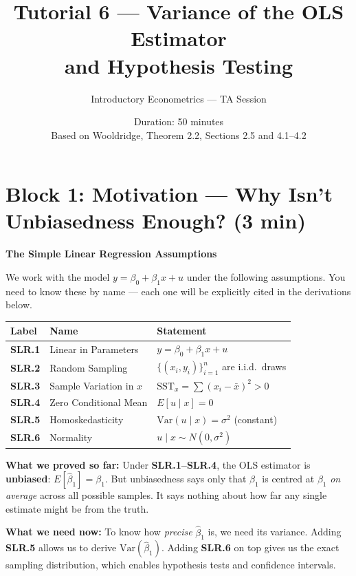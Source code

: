 \documentclass[11pt,a4paper]{article}
\title{\textbf{Tutorial 6 --- Variance of the OLS Estimator\\ and Hypothesis Testing}}
\author{Introductory Econometrics --- TA Session}
\date{Duration: 50 minutes \\ \medskip \small Based on Wooldridge, Theorem 2.2, Sections 2.5 and 4.1--4.2}
\begin{document}
\maketitle
\thispagestyle{empty}

\section{Block 1: Motivation --- Why Isn't Unbiasedness Enough? \textnormal{(3 min)}}

\begin{bookexample}
\textbf{\color{blockcolor}The Simple Linear Regression Assumptions}

\medskip
We work with the model $y = \beta_0 + \beta_1 x + u$ under the following assumptions. You need to know these by name --- each one will be explicitly cited in the derivations below.

\medskip
\renewcommand{\arraystretch}{1.4}
\begin{tabular}{lll}
\toprule
\textbf{Label} & \textbf{Name} & \textbf{Statement} \\
\midrule
\textbf{SLR.1} & Linear in Parameters & $y = \beta_0 + \beta_1 x + u$ \\
\textbf{SLR.2} & Random Sampling & $\{(x_i, y_i)\}_{i=1}^n$ are i.i.d.\ draws \\
\textbf{SLR.3} & Sample Variation in $x$ & $\text{SST}_x = \sum (x_i - \bar{x})^2 > 0$ \\
\textbf{SLR.4} & Zero Conditional Mean & $E[u \mid x] = 0$ \\
\textbf{SLR.5} & Homoskedasticity & $\text{Var}(u \mid x) = \sigma^2$ (constant) \\
\textbf{SLR.6} & Normality & $u \mid x \sim N(0, \sigma^2)$ \\
\bottomrule
\end{tabular}
\renewcommand{\arraystretch}{1.0}

\medskip
\textbf{What we proved so far:} Under \textbf{SLR.1--SLR.4}, the OLS estimator is \textbf{unbiased}: $E[\hat{\beta}_1] = \beta_1$. But unbiasedness says only that $\hat{\beta}_1$ is centred at $\beta_1$ \emph{on average} across all possible samples. It says nothing about how far any single estimate might be from the truth.

\medskip
\textbf{What we need now:} To know how \emph{precise} $\hat{\beta}_1$ is, we need its variance. Adding \textbf{SLR.5} allows us to derive $\text{Var}(\hat{\beta}_1)$. Adding \textbf{SLR.6} on top gives us the exact sampling distribution, which enables hypothesis tests and confidence intervals.
\end{bookexample}
\end{document}
